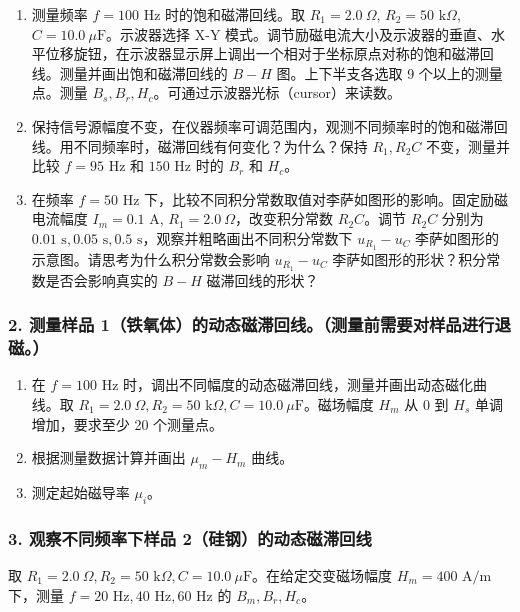 \documentclass[11pt]{article}
\begin{document}
\begin{enumerate}
    \item 测量频率 $f=100\text{ Hz}$ 时的饱和磁滞回线。取 $R_1=2.0\ \Omega$, $R_2=50\text{ k}\Omega$, $C=10.0\ \mu\text{F}$。示波器选择 X-Y 模式。调节励磁电流大小及示波器的垂直、水平位移旋钮，在示波器显示屏上调出一个相对于坐标原点对称的饱和磁滞回线。测量并画出饱和磁滞回线的 $B-H$ 图。上下半支各选取 9 个以上的测量点。测量 $B_s, B_r, H_c$。可通过示波器光标（cursor）来读数。
    
    \item 保持信号源幅度不变，在仪器频率可调范围内，观测不同频率时的饱和磁滞回线。用不同频率时，磁滞回线有何变化？为什么？保持 $R_1, R_2C$ 不变，测量并比较 $f=95\text{ Hz}$ 和 $150\text{ Hz}$ 时的 $B_r$ 和 $H_c$。
    
    \item 在频率 $f=50\text{ Hz}$ 下，比较不同积分常数取值对李萨如图形的影响。固定励磁电流幅度 $I_m=0.1\text{ A}$, $R_1=2.0\ \Omega$，改变积分常数 $R_2C$。调节 $R_2C$ 分别为 $0.01\text{ s}, 0.05\text{ s}, 0.5\text{ s}$，观察并粗略画出不同积分常数下 $u_{R_1}-u_C$ 李萨如图形的示意图。请思考为什么积分常数会影响 $u_{R_1}-u_C$ 李萨如图形的形状？积分常数是否会影响真实的 $B-H$ 磁滞回线的形状？
\end{enumerate}

\subsubsection{2. 测量样品 1（铁氧体）的动态磁滞回线。（测量前需要对样品进行退磁。）}

\begin{enumerate}
    \item 在 $f=100\text{ Hz}$ 时，调出不同幅度的动态磁滞回线，测量并画出动态磁化曲线。取 $R_1=2.0\ \Omega, R_2=50\text{ k}\Omega, C=10.0\ \mu\text{F}$。磁场幅度 $H_m$ 从 0 到 $H_s$ 单调增加，要求至少 20 个测量点。
    \item 根据测量数据计算并画出 $\mu_m - H_m$ 曲线。
    \item 测定起始磁导率 $\mu_i$。
\end{enumerate}

\subsubsection{3. 观察不同频率下样品 2（硅钢）的动态磁滞回线}

取 $R_1=2.0\ \Omega, R_2=50\text{ k}\Omega, C=10.0\ \mu\text{F}$。在给定交变磁场幅度 $H_m=400\text{ A/m}$ 下，测量 $f=20\text{ Hz}, 40\text{ Hz}, 60\text{ Hz}$ 的 $B_m, B_r, H_c$。
\end{document}
